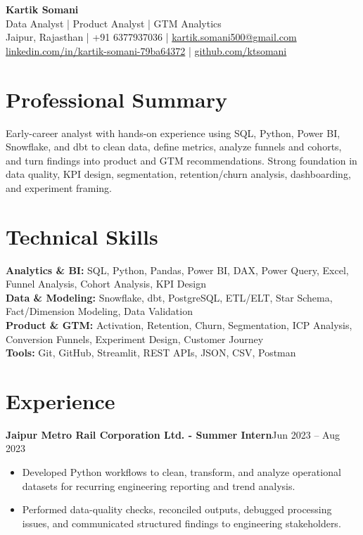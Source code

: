 \documentclass[9.8pt,a4paper]{article}
\newcommand{\role}[2]{\textbf{#1}\hfill #2\\}
\begin{document}
\begin{center}
{\LARGE\bfseries Kartik Somani}\\[1pt]
{\small Data Analyst | Product Analyst | GTM Analytics}\\[2pt]
Jaipur, Rajasthan \;|\; +91 6377937036 \;|\; \href{mailto:kartik.somani500@gmail.com}{kartik.somani500@gmail.com}\\[-1pt]
\href{https://linkedin.com/in/kartik-somani-79ba64372}{linkedin.com/in/kartik-somani-79ba64372} \;|\; \href{https://github.com/ktsomani}{github.com/ktsomani}
\end{center}
\vspace{-7pt}

\section{Professional Summary}
Early-career analyst with hands-on experience using SQL, Python, Power BI, Snowflake, and dbt to clean data, define metrics, analyze funnels and cohorts, and turn findings into product and GTM recommendations. Strong foundation in data quality, KPI design, segmentation, retention/churn analysis, dashboarding, and experiment framing.

\section{Technical Skills}
\textbf{Analytics \& BI:} SQL, Python, Pandas, Power BI, DAX, Power Query, Excel, Funnel Analysis, Cohort Analysis, KPI Design \\
\textbf{Data \& Modeling:} Snowflake, dbt, PostgreSQL, ETL/ELT, Star Schema, Fact/Dimension Modeling, Data Validation \\
\textbf{Product \& GTM:} Activation, Retention, Churn, Segmentation, ICP Analysis, Conversion Funnels, Experiment Design, Customer Journey \\
\textbf{Tools:} Git, GitHub, Streamlit, REST APIs, JSON, CSV, Postman

\section{Experience}
\role{Jaipur Metro Rail Corporation Ltd. - Summer Intern}{Jun 2023 -- Aug 2023}
\begin{itemize}
  \item Developed Python workflows to clean, transform, and analyze operational datasets for recurring engineering reporting and trend analysis.
  \item Performed data-quality checks, reconciled outputs, debugged processing issues, and communicated structured findings to engineering stakeholders.
\end{itemize}
\end{document}
